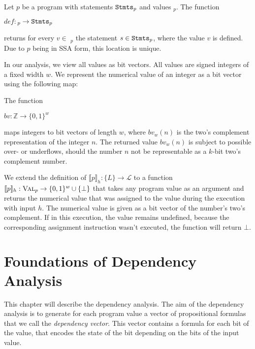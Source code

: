 \begin{definition}
    Let $p$ be a program with statements $\mathtt{Stmts}_p$ and values \val$_p$. The function
    \begin{center}
        $def: $\val$_p \to \mathtt{Stmts}_p$
    \end{center}
    returns for every $v \in$ \val$_p$ the statement $s \in \mathtt{Stmts}_p$, where the value $v$ is defined. Due to $p$ being in SSA form, this location is unique.
\end{definition}

In our analysis, we view all values as bit vectors. All values are signed integers of a fixed width $w$. We represent the numerical value of an integer as a bit vector using the following map:

\begin{definition}
    The function
    \begin{center}
        $bv: \mathbb{Z} \to \{0, 1\}^w$
    \end{center}
    maps integers to bit vectors of length $w$, where $bv_w(n)$ is the two's complement representation of the integer $n$.
    The returned value $bv_w(n)$ is subject to possible over- or underflows, should the number $n$ not be representable as a $k$-bit two's complement number.
\end{definition}

\begin{definition}
We extend the definition of $\llbracket p \rrbracket_h: \{L\} \to \mathcal{L}$ to a function $\llbracket p \rrbracket_h: \textsc{Val}_p \to \{0, 1\}^w \cup \{\bot\}$ that takes any program value as an argument and returns the numerical value that was assigned to the value during the execution with input $h$. The numerical value is given as a bit vector of the number's two's complement. If in this execution, the value remains undefined, because the corresponding assignment instruction wasn't executed, the function will return $\bot$.
\end{definition}

\section{Foundations of Dependency Analysis}\label{sec:prop}

This chapter will describe the dependency analysis. The aim of the dependency analysis is to generate for each program value a vector of propositional formulas that we call the \emph{dependency vector}. This vector contains a formula for each bit of the value, that encodes the state of the bit depending on the bits of the input value.


